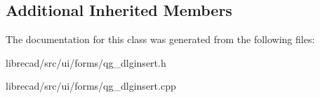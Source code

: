 \subsection*{Additional Inherited Members}


The documentation for this class was generated from the following files\-:\begin{DoxyCompactItemize}
\item 
librecad/src/ui/forms/qg\-\_\-dlginsert.\-h\item 
librecad/src/ui/forms/qg\-\_\-dlginsert.\-cpp\end{DoxyCompactItemize}
